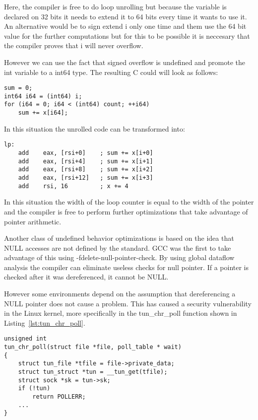 Here, the compiler is free to do loop unrolling but because the variable
is declared on 32 bits it needs to extend it to 64 bits every time it
wants to use it. An alternative would be to sign extend i only one time
and them use the 64 bit value for the further computations but for this
to be possible it is neccesary that the compiler proves that i will
never overflow.

However we can use the fact that signed overflow is undefined and
promote the int variable to a int64 type. The resulting C could will
look as follows:
\begin{lstlisting}[style=Cstyle, caption={}, label={}]
sum = 0;
int64 i64 = (int64) i;
for (i64 = 0; i64 < (int64) count; ++i64)
	sum += x[i64];
\end{lstlisting}

In this situation the unrolled code can be transformed into:
\begin{lstlisting}[style=Cstyle, caption={}, label={}]
  lp:
    add    eax, [rsi+0]    ; sum += x[i+0]
    add    eax, [rsi+4]    ; sum += x[i+1]
    add    eax, [rsi+8]    ; sum += x[i+2]
    add    eax, [rsi+12]   ; sum += x[i+3]
    add    rsi, 16         ; x += 4
\end{lstlisting}

In this situation the width of the loop counter is equal to the width of
the pointer and the compiler is free to perform further optimizations
that take advantage of pointer arithmetic.

Another class of undefined behavior optimizations is based on the idea
that NULL accesses are not defined by the standard. GCC was the first to
take advantage of this using -fdelete-null-pointer-check. By using
global dataflow analysis the compiler can eliminate useless checks for
null pointer. If a pointer is checked after it was dereferenced, it
cannot be NULL.

However some environments depend on the assumption that dereferencing a
NULL pointer does not cause a problem. This has caused a security
vulnerability in the Linux kernel, more specifically in the tun_chr_poll
function shown in Listing~\ref{lst:tun_chr_poll}.
\begin{lstlisting}[style=Cstyle, caption={tun_chr_poll in
drivers/net/tun.c of the Linux kernel}, label={lst:tun_chr_poll}]
unsigned int
tun_chr_poll(struct file *file, poll_table * wait)
{
	struct tun_file *tfile = file->private_data;
	struct tun_struct *tun = __tun_get(tfile);
	struct sock *sk = tun->sk;
	if (!tun)
		return POLLERR;
	...
}
\end{lstlisting}

